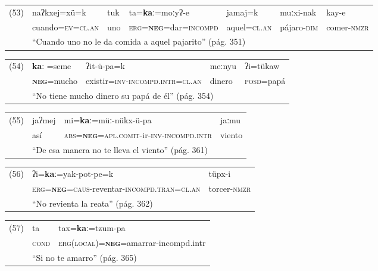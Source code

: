 {\setmainfont{Charis SIL}

{\footnotesize
\noindent \begin{tabular}{lllllll}
(53) & naʔkxej=xü=k & tuk & ta=\textbf{kaː}=moːyʔ-e & jamaj=k & muːxi-nak & kay-e \\
& cuando=\textsc{ev=cl.an} & uno & \textsc{erg=\textbf{neg}}=dar=\textsc{incompd} & aquel=\textsc{cl.an} & pájaro-\textsc{dim} & comer-\textsc{nmzr} \\
& \multicolumn{6}{l}{``Cuando uno no le da comida a aquel pajarito'' (pág. 351)}
\end{tabular} \vspace{0.3cm}
}

\begin{tabular}{lllll}
(54) & \textbf{kaː} =seme & ʔit-ü-pa=k & meːnyu & ʔi=tükaw \\
& \textsc{\textbf{neg}}=mucho & existir=\textsc{inv-incompd.intr=cl.an} & dinero & \textsc{posd}=papá \\
& \multicolumn{4}{l}{``No tiene mucho dinero su papá de él'' (pág. 354)}
\end{tabular} \vspace{0.3cm}

\begin{tabular}{llll}
(55) & jaʔmej & mi=\textbf{kaː}=müː-nükx-ü-pa & jaːmu \\
& así & \textsc{abs=\textbf{neg}=apl.comit}-ir-\textsc{inv-incompd.intr} & viento \\
& \multicolumn{3}{l}{``De esa manera no te lleva el viento'' (pág. 361)}
\end{tabular} \vspace{0.3cm}

\begin{tabular}{lll}
(56) & ʔi=\textbf{kaː}=yak-pot-pe=k & tüpx-i \\
& \textsc{erg=\textbf{neg}=caus}-reventar-\textsc{incompd.tran=cl.an} & torcer-\textsc{nmzr}\\
& \multicolumn{2}{l}{``No revienta la reata'' (pág. 362)}
\end{tabular} \vspace{0.3cm}

\begin{tabular}{lll}
(57) & ta & tax=\textbf{kaː}=tzum-pa \\
& \textsc{cond} & \textsc{erg(local)=\textbf{neg}}=amarrar-incompd.intr \\
& \multicolumn{2}{l}{``Si no te amarro'' (pág. 365)}
\end{tabular} \vspace{0.3cm}

}
